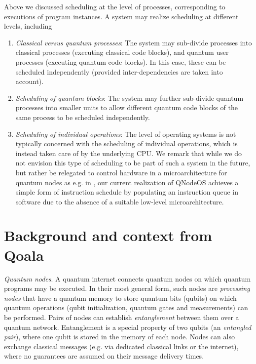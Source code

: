 Above we discussed scheduling at the level of processes, corresponding to executions of program instances. A system may realize scheduling at different levels, including
%
\begin{enumerate}
\item \emph{Classical versus quantum processes}: The system may sub-divide processes into classical processes (executing classical code blocks), and quantum user processes (executing quantum code blocks). In this case, these can be scheduled independently (provided inter-dependencies are taken into account). 
\item \emph{Scheduling of quantum blocks}: The system may further sub-divide quantum processes into smaller units to allow different quantum code blocks of the same process to be scheduled independently.
\item \emph{Scheduling of individual operations}: The level of operating systems is not typically concerned with the scheduling of individual operations, which is instead taken care of by the underlying \ac{CPU}. We remark that while we do not envision this type of scheduling to be part of such a system in the future, but rather be relegated to control hardware in a microarchitecture for quantum nodes as e.g. in 
\textcite{fu_2017_microarch}, our current realization of \ac{QNodeOS} achieves a simple form of instruction schedule by populating an instruction queue in software due to the absence of a suitable low-level microarchitecture.
\end{enumerate}




\section{Background and context from Qoala}

\textit{Quantum nodes}.
A quantum internet connects quantum nodes on which quantum programs may be 
executed.
In their most general form, such nodes
are \textit{processing nodes} that have a quantum memory to store quantum bits (qubits) on which quantum operations (qubit initialization, quantum gates and measurements) can be performed. Pairs of nodes can establish \textit{entanglement} between them over a quantum network. Entanglement is a special property of two qubits (an \emph{entangled pair}), where one qubit is stored in the memory of each node. Nodes can also exchange classical messages (e.g. via dedicated classical links or the internet), where no guarantees are assumed on their message delivery times. 

